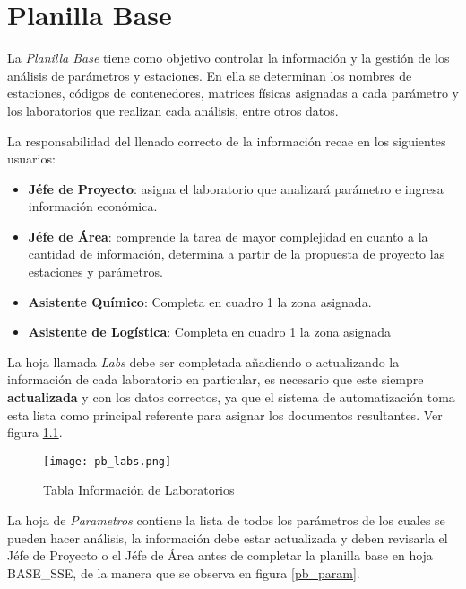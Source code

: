 \chapter{Planilla Base}

La \textit{Planilla Base} tiene como objetivo controlar la información y la gestión de los análisis de parámetros y estaciones. En ella se determinan los nombres de estaciones, códigos de contenedores, matrices físicas asignadas a cada parámetro y los laboratorios que realizan cada análisis, entre otros datos.

La responsabilidad del llenado correcto de la información recae en los siguientes usuarios:

\begin{itemize}
	\item \textbf{Jéfe de Proyecto}: asigna el laboratorio que analizará parámetro e ingresa información económica.
	\item \textbf{Jéfe de Área}: comprende la tarea de mayor complejidad en cuanto a la cantidad de información, determina a partir de la propuesta de proyecto las estaciones y parámetros.
	\item \textbf{Asistente Químico}: Completa en cuadro 1 la zona asignada.
	\item \textbf{Asistente de Logística}: Completa en cuadro 1 la zona asignada
\end{itemize}

La hoja llamada \textit{Labs} debe ser completada añadiendo o actualizando la información de cada laboratorio en particular, es necesario que este siempre \textbf{actualizada} y con los datos correctos, ya que el sistema de automatización toma esta lista como principal referente para asignar los documentos resultantes. Ver figura \ref{pb_labs}.

\begin{landscape}
\begin{figure}
	\centering
	\texttt{[image: pb\_labs.png]}
	\caption{Tabla Información de Laboratorios}
	\label{pb_labs}
\end{figure}
\end{landscape}
	
La hoja de \textit{Parametros} contiene la lista de todos los parámetros de los cuales se pueden hacer análisis, la información debe estar actualizada y deben revisarla el Jéfe de Proyecto o el Jéfe de Área antes de completar la planilla base en hoja \MakeUppercase{base\_sse}, de la manera que se observa en figura \ref{pb_param}.

